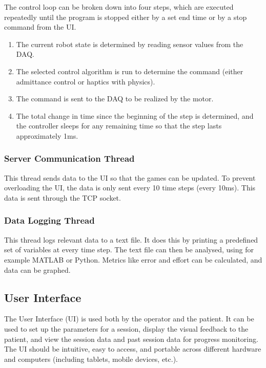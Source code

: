 \documentclass[12pt]{report}
\begin{document}
	The control loop can be broken down into four steps, which are executed repeatedly until the program is stopped either by a set end time or by a stop command from the UI. 
	
	\begin{enumerate}
		\item The current robot state is determined by reading sensor values from the DAQ.
		\item The selected control algorithm is run to determine the command (either admittance control or haptics with physics). 
		\item The command is sent to the DAQ to be realized by the motor. 
		\item The total change in time since the beginning of the step is determined, and the controller sleeps for any remaining time so that the step lasts approximately 1ms. 
	\end{enumerate}
	
	\subsubsection{Server Communication Thread}
	
	This thread sends data to the UI so that the games can be updated. To prevent overloading the UI, the data is only sent every 10 time steps (every 10ms). This data is sent through the TCP socket. 	
	
	\subsubsection{Data Logging Thread}
	This thread logs relevant data to a text file. It does this by printing a predefined set of variables at every time step. The text file can then be analysed, using for example MATLAB or Python. Metrics like error and effort can be calculated, and data can be graphed. 
	
	\subsection{User Interface} 
	
	The User Interface (UI) is used both by the operator and the patient. It can be used to set up the parameters for a session, display the visual feedback to the patient, and  view the session data and past session data for progress monitoring. The UI should be intuitive, easy to access, and portable across different hardware and computers (including tablets, mobile devices, etc.).
	
\end{document}
